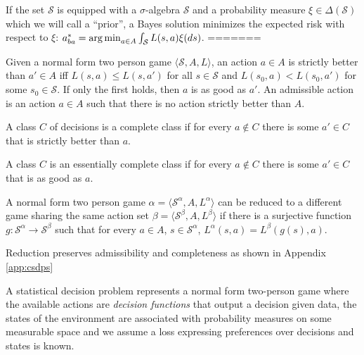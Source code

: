 If the set $\mathscr{S}$ is equipped with a $\sigma$-algebra $\mathcal{S}$ and a probability measure $\xi\in \Delta(\mathcal{S})$ which we will call a ``prior'', a Bayes solution minimizes the expected risk with respect to $\xi$: $a^*_{ba} = \operatorname*{arg\,min}_{a\in A} \int_{\mathcal{S}} L(s,a) \xi(ds)$.
=======


\begin{definition}
Given a normal form two person game $\langle \mathscr{S}, A, L\rangle$, an action $a\in A$ is strictly better than $a'\in A$ iff $L(s,a)\leq L(s,a')$ for all $s\in\mathscr{S}$ and $L(s_0,a)<L(s_0,a')$ for some $s_0\in \mathscr{S}$. If only the first holds, then $a$ is as good as $a'$. An admissible action is an action $a\in A$ such that there is no action strictly better than $A$.
\end{definition}

\begin{definition}
A class $C$ of decisions is a complete class if for every $a\not\in C$ there is some $a'\in C$ that is strictly better than $a$.

A class $C$ is an essentially complete class if for every $a\not\in C$ there is some $a'\in C$ that is as good as $a$.
\end{definition}

\begin{definition}[Reduction]\label{def:red_sdp_CSDP}
A normal form two person game $\alpha = \langle \mathscr{S}^\alpha, A, L^\alpha\rangle$ can be reduced to a different game sharing the same action set $\beta = \langle \mathscr{S}^\beta, A, L^\beta \rangle$ if there is a surjective function $g:\mathscr{S}^\alpha\to \mathscr{S}^\beta$ such that for every $a\in A$, $s\in \mathscr{S}^\alpha$, $L^\alpha(s,a) = L^\beta(g(s),a)$.
\end{definition}

Reduction preserves admissibility and completeness as shown in Appendix \ref{app:csdps}

A statistical decision problem represents a normal form two-person game where the available actions are \emph{decision functions} that output a decision given data, the states of the environment are associated with probability measures on some measurable space and we assume a loss expressing preferences over decisions and states is known.

